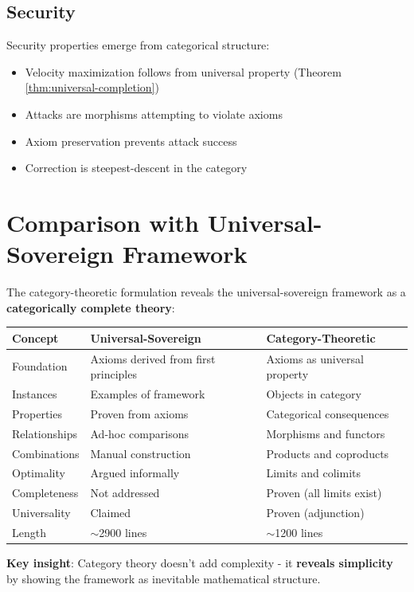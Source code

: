 \documentclass[11pt,a4paper]{article}
\theoremstyle{definition}
\theoremstyle{remark}
\begin{document}
\subsection{Security}

Security properties emerge from categorical structure:
\begin{itemize}
\item Velocity maximization follows from universal property (Theorem \ref{thm:universal-completion})
\item Attacks are morphisms attempting to violate axioms
\item Axiom preservation prevents attack success
\item Correction is steepest-descent in the category
\end{itemize}

\section{Comparison with Universal-Sovereign Framework}

The category-theoretic formulation reveals the universal-sovereign framework as a \textbf{categorically complete theory}:

\begin{center}
\begin{tabular}{lll}
\toprule
\textbf{Concept} & \textbf{Universal-Sovereign} & \textbf{Category-Theoretic} \\
\midrule
Foundation & Axioms derived from first principles & Axioms as universal property \\
Instances & Examples of framework & Objects in category \\
Properties & Proven from axioms & Categorical consequences \\
Relationships & Ad-hoc comparisons & Morphisms and functors \\
Combinations & Manual construction & Products and coproducts \\
Optimality & Argued informally & Limits and colimits \\
Completeness & Not addressed & Proven (all limits exist) \\
Universality & Claimed & Proven (adjunction) \\
\midrule
Length & $\sim$2900 lines & $\sim$1200 lines \\
\bottomrule
\end{tabular}
\end{center}

\textbf{Key insight}: Category theory doesn't add complexity - it \textbf{reveals simplicity} by showing the framework as inevitable mathematical structure.
\end{document}
